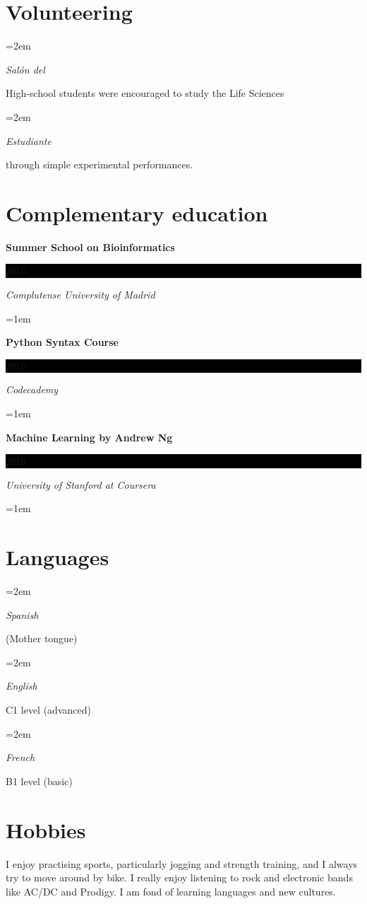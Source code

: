\documentclass[paper=a4,fontsize=11pt]{article} %
\newlength{\spacebox}
\newcommand{\sepspace}{\vspace*{1em}}		%
\newcommand{\NewPart}[1]{\section*{
									{#1}}}
\newcommand{\PersonalEntry}[2]{
		\noindent\hangindent=2em\hangafter=0 %
		\parbox{\spacebox}{        %
		\textit{#1}}		       %
		\hspace{1.5em} #2 \par}    %
\newcommand{\SkillsEntry}[2]{      %
		\noindent\hangindent=2em\hangafter=0 %
		\parbox{\spacebox}{        %
		\textit{#1}}			   %
		\hspace{1.5em} #2 \par}    %
\newcommand{\EducationEntry}[4]{
		\noindent \textbf{#1} \hfill      %
		\colorbox{Black}{%
			\parbox{6em}{%
			\hfill\color{White}#2}} \par  %
		\noindent \textit{#3} \par        %
		\noindent\hangindent=1em\hangafter=0 \small #4 %
		\normalsize \par}
\newcommand{\AwardEntry}[4]{
		\noindent \textbf{#1} \hfill      %
		\colorbox{Black}{%
			\parbox{3em}{%
			\hfill\color{White}#2}} \par  %
		\noindent \textit{#3} \par        %
		  \noindent\hangindent=1em\hangafter=0 \small #4  %
		\normalsize \par}
\newcommand{\VolunteeringEntry}[2]{      %
		\noindent\hangindent=2em\hangafter=0 %
		\parbox{\spacebox}{        %
		\textit{#1}}			   %
		\hspace{1.5em} #2 \par}    %
\begin{document}
  




\NewPart{Volunteering}
\VolunteeringEntry{Salón del}{High-school students were encouraged to study the Life Sciences}
\VolunteeringEntry{Estudiante}{through simple experimental performances.}


  


  
  
\NewPart{Complementary education}{}


\AwardEntry{Summer School on Bioinformatics}{2015}{Complutense University of Madrid}{}  
  
\AwardEntry{Python Syntax Course}{2015}{Codecademy}{}


\AwardEntry{Machine Learning by Andrew Ng}{2016}{University of Stanford at Coursera}{}


\NewPart{Languages}

\SkillsEntry{Spanish}{(Mother tongue)}
\sepspace

\SkillsEntry{English}{C1 level (advanced)}
\sepspace

\SkillsEntry{French}{B1 level (basic)}
\sepspace




%
%


\NewPart{Hobbies}
I enjoy practising sports, particularly jogging and strength training, and I always try to move around by bike. I really enjoy listening to rock and electronic bands like AC/DC and Prodigy. I am fond of learning languages and new cultures.
\end{document}
